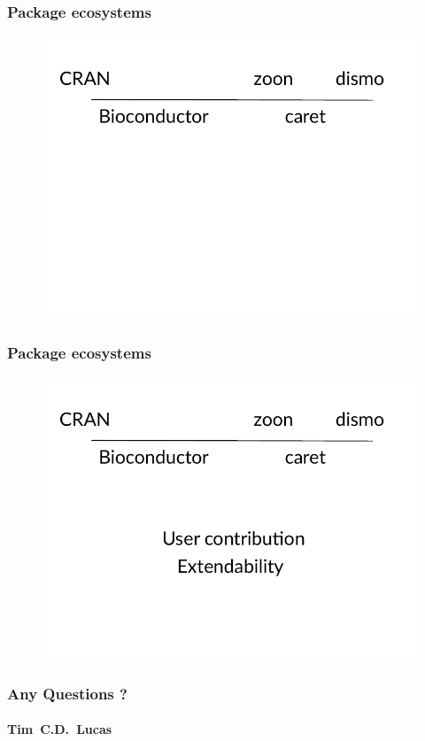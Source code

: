 \documentclass{beamer}
\begin{document}
\begin{frame}
\frametitle{Package ecosystems}
\begin{figure}
    \includegraphics[height = 0.8\textheight]{continuum.pdf}
\end{figure} 
\end{frame} 



\begin{frame}
\frametitle{Package ecosystems}
\begin{figure}
    \includegraphics[height = 0.8\textheight]{continuum_traits.pdf}
\end{figure} 
\end{frame} 




\begin{frame}
\frametitle{Any Questions ?}
\vspace{2cm}
\framesubtitle{{\color{black} \normalsize{Tim}~\small{C.D.}~\normalsize{Lucas}}}
\end{frame}
%  
%
%
% 
% 
%
%
%
%
%
%
\end{document}
